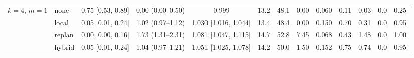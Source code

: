 \begin{table}[tb]
\begin{tabular}{@{}llccccccccccc@{}}
  \midrule
  $k{=}4$, $m{=}1$ & none   & 0.75 [0.53, 0.89] & 0.00 (0.00--0.50) & 0.999 & 13.2 & 48.1 & 0.00 & 0.060 & 0.11 & 0.03 & 0.0 & 0.25\\
                   & local  & 0.05 [0.01, 0.24] & 1.02 (0.97--1.12) & 1.030 [1.016, 1.044] & 13.4 & 48.4 & 0.00 & 0.150 & 0.70 & 0.31 & 0.0 & 0.95\\
                   & replan & 0.00 [0.00, 0.16] & 1.73 (1.31--2.31) & 1.081 [1.047, 1.115] & 14.7 & 52.8 & 7.45 & 0.068 & 0.43 & 1.48 & 0.0 & 1.00\\
                   & hybrid & 0.05 [0.01, 0.24] & 1.04 (0.97--1.21) & 1.051 [1.025, 1.078] & 14.2 & 50.0 & 1.50 & 0.152 & 0.75 & 0.74 & 0.0 & 0.95\\
  \bottomrule
  \end{tabular}
\end{table}

